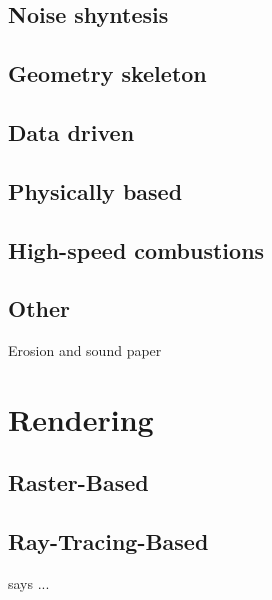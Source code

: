 \subsection{Noise shyntesis}

\subsection{Geometry skeleton}

\subsection{Data driven}

\subsection{Physically based}

\subsection{High-speed combustions}

\subsection{Other}
	Erosion and sound paper




\section{Rendering}
\label{sec:rendering}


\subsection{Raster-Based}
\label{sec:raster_based}


\subsection{Ray-Tracing-Based}
\label{sec:ray_tracing_based}


\cite{Pegoraro:2006} says ...